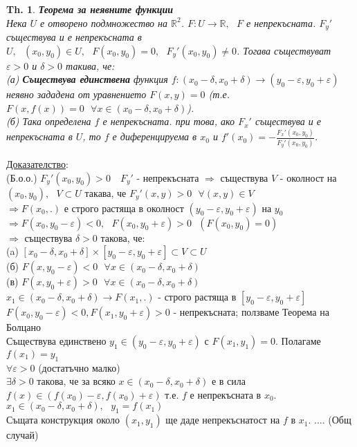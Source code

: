 \documentclass[12pt]{article}
\newtheorem{theorem}{Th.}
\newcommand{\spc}{\text{ }}
\begin{document}
	
	\begin{theorem}
		\textbf{Теорема за неявните функции}\\
		Нека $U$ е отворено подмножество на $\mathbb{R}^2$. $F:U\rightarrow \mathbb{R}, \spc F$ е непрекъсната. $F_y'$ съществува и е непрекъсната в $U, \spc (x_0, y_0) \in U, \spc F(x_0, y_0) = 0, \spc F_y'(x_0, y_0) \neq 0$. Тогава съществуват $\varepsilon>0$ и $\delta>0$ такива, че:\\
		(а) \textbf{Съществува единствена} функция
		$f:(x_0-\delta, x_0+\delta) \rightarrow (y_0 - \varepsilon, y_0 + \varepsilon)$ неявно зададена от уравнението $F(x,y) = 0$ (т.е. $F(x,f(x))=0 \spc \forall x \in (x_0-\delta, x_0+\delta)$). \\
		(б) Така определена $f$ е непрекъсната. при това, ако $F_x'$ съществува и е непрекъсната в $U$, то $f$ е диференцируема в $x_0$ и $f'(x_0) = - \frac{F_x'(x_0,y_0)}{F_y'(x_0,y_0)}$.
	\end{theorem}
	\underline{Доказателство}:\\
	(Б.о.о.) $F_y'(x_0, y_0) > 0 \quad F_y'$ - непрекъсната $\Rightarrow$ съществува $V$ - околност на $(x_0, y_0), \spc V\subset U$ такава, че $F_y'(x,y)>0 \spc \forall(x,y)\in V$ \\
	$\Rightarrow F(x_0, \textbf{.} )$ е строго растяща в околност $(y_0-\varepsilon, y_0+\varepsilon)$ на $y_0$\\
	$\Rightarrow F(x_0, y_0 -\varepsilon)<0, \spc F(x_0, y_0 +\varepsilon)>0 \spc (F(x_0, y_0) = 0)$ \\ 
	$\Rightarrow$ съществува $\delta >0$ такова, че: \\
	(a) $[x_0 - \delta, x_0+\delta]  \times [y_0-\varepsilon, y_0 + \varepsilon] \subset V \subset U$\\
	(б) $F(x, y_0 - \varepsilon) < 0 \spc \forall x \in (x_0 - \delta, x_0 + \delta)$\\
	(в) $F(x, y_0 + \varepsilon) > 0 \spc \forall x \in (x_0 - \delta, x_0 + \delta)$\\
	$\spc$\\
	$x_1\in(x_0-\delta, x_0 + \delta) \rightarrow F(x_1, \textbf{.})$ - строго растяща в $[y_0-\varepsilon, y_0+\varepsilon]$\\
	$F(x_0, y_0 - \varepsilon) < 0, F(x_1, y_0 + \varepsilon)> 0$ - непрекъсната; ползваме Теорема на Болцано\\
	Съществува единствено $y_1\in(y_0-\varepsilon, y_0+\varepsilon)$ с $F(x_1, y_1)=0$. Полагаме $f(x_1) = y_1$\\
	$\forall \varepsilon > 0 $ (достатъчно малко)\\
	$\exists \delta > 0$ такова, че за всяко $x\in(x_0 - \delta, x_0 + \delta)$ е в сила $f(x)\in (f(x_0)-\varepsilon, f(x_0)+\varepsilon)$ т.е. $f$ е непрекъсната в $x_0$.\\
	$x_1 \in (x_0-\delta, x_0 +\delta), \spc y_1 = f(x_1)$\\
	Същата конструкция около $(x_1, y_1)$ ще даде непрекъснатост на $f$ в $x_1$. 
	....
	(Общ случай)
	
\end{document}
